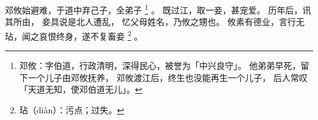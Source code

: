 
\switchcolumn*[\section{}]

邓攸始避难，于道中弃己子，全弟子%
\footnote{%
    邓攸：字伯道，行政清明，深得民心，被誉为「中兴良守」。
          他弟弟早死，留下一个儿子由邓攸抚养，
          邓攸渡江后，终生也没能再生一个儿子，
          后人常叹「天道无知，使邓伯道无儿」。
}%
。
既过江，取一妾，甚宠爱。
历年后，讯其所由，
妾具说是北人遭乱，
忆父母姓名，乃攸之甥也。
攸素有德业，言行无玷，闻之哀恨终身，遂不复畜妾%
\footnote{%
    玷（diàn）：污点；过失。
}%
。

\switchcolumn



